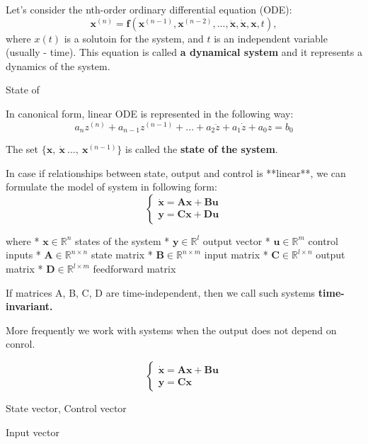 
\begin{tcolorbox}[colback=green!10,colframe=green!50!black,title=\textbf{Dynamical systems}]
    Let's consider the nth-order ordinary differential equation (ODE):
    \[\mathbf{x}^{(n)}=\mathbf{f}(\mathbf{x}^{(n-1)},\mathbf{x}^{(n-2)},...,\ddot{\mathbf{x}},\dot{\mathbf{x}},\mathbf{x},t),\]
    where $x(t)$ is a solutoin for the system, and $t$ is an independent variable (usually - time).
    This equation is called \textbf{a dynamical system} and it represents a dynamics of the system.

\end{tcolorbox}

State of 


In canonical form, linear ODE is represented in the following way:
\[a_{n}z^{(n)} +a_{n-1}z^{(n-1)}+...+a_{2}\ddot z+a_{1}\dot z + a_0 z= b_0\]

The set $\{ \mathbf{x}, \ \dot{\mathbf{x}} \ ..., \ \mathbf{x}^{(n-1)} \}$ is called the \textbf{state  of the system}.


In case if relationships between state, output and control is **linear**, we can formulate the model of system in following form:
\begin{equation}
\begin{cases}
\mathbf{\dot{x}} =\mathbf{A}\mathbf{x} + \mathbf{B}\mathbf{u} \\
\mathbf{y}=\mathbf{C}\mathbf{x} + \mathbf{D}\mathbf{u}
\end{cases}
\end{equation}

where
*   $\mathbf{x} \in \mathbb{R}^n$ states of the system
*   $\mathbf{y} \in \mathbb{R}^l$ output vector
*   $\mathbf{u} \in \mathbb{R}^m$ control inputs
*   $\mathbf{A} \in \mathbb{R}^{n \times n}$ state matrix
*   $\mathbf{B} \in \mathbb{R}^{n \times m}$ input matrix
*   $\mathbf{C} \in \mathbb{R}^{l \times n}$ output matrix
*   $\mathbf{D} \in \mathbb{R}^{l \times m}$ feedforward matrix

If matrices A, B, C, D are time-independent, then we call such systems \textbf{time-invariant.} 

More frequently we work with systems when the output does not depend on conrol. 

\begin{equation}
    \begin{cases}
    \mathbf{\dot{x}}=\mathbf{A}\mathbf{x} + \mathbf{B}\mathbf{u} \\
    \mathbf{y}=\mathbf{C}\mathbf{x}
    \end{cases}
    \end{equation}

State vector, 
Control vector


Input vector